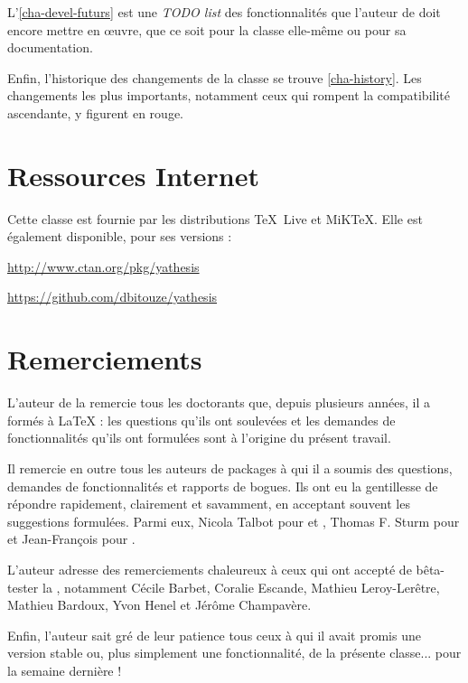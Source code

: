 L'\vref{cha-devel-futurs} est une \emph{TODO list} des fonctionnalités que
l'auteur de \yatcl{} doit encore mettre en œuvre, que ce soit pour la classe
elle-même ou pour sa documentation.

Enfin, l'historique des changements de la classe se trouve \vref{cha-history}.
Les changements les plus importants, notamment ceux qui rompent la compatibilité
ascendante, y figurent en rouge.

\section{Ressources Internet}
\label{sec-ressources-internet}

Cette classe est fournie par les distributions \TeX~Live et MiK\TeX{}. Elle est
également disponible, pour ses versions :
\begin{description}[labelwidth=\widthof{\bfseries de développement à :},align=right]
\item[stable à :] \url{http://www.ctan.org/pkg/yathesis}
\item[de développement à :] \url{https://github.com/dbitouze/yathesis}
\end{description}

\section{Remerciements}
\label{sec-remerciements}

L'auteur de la \yatCl{} remercie tous les doctorants que, depuis plusieurs
années, il a formés à \LaTeX{} : les questions qu'ils ont soulevées et les
demandes de fonctionnalités qu'ils ont formulées sont à l'origine du présent
travail.

Il remercie en outre tous les auteurs de packages à qui il a soumis  des questions, demandes de fonctionnalités et rapports
de bogues. Ils ont eu la gentillesse de répondre rapidement, clairement et
savamment, en acceptant souvent les suggestions formulées. Parmi eux, Nicola
Talbot pour  et , Thomas F. Sturm
pour  et Jean-François pour .

L'auteur adresse des remerciements chaleureux à ceux qui ont accepté de
bêta-tester la \yatCl{}, notamment Cécile Barbet, Coralie Escande, Mathieu
Leroy-Lerêtre, Mathieu Bardoux, Yvon Henel et Jérôme Champavère.

Enfin, l'auteur sait gré de leur patience tous ceux à qui il avait promis une
version stable ou, plus simplement une fonctionnalité, de la présente
classe... pour la semaine dernière !

